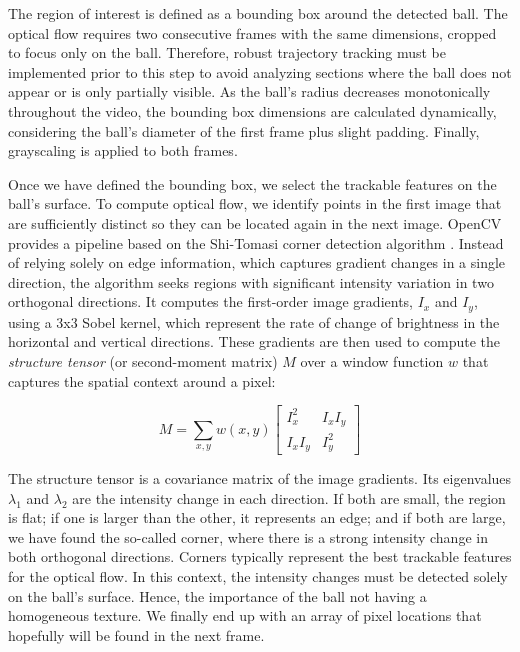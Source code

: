 The region of interest is defined as a bounding box around the detected ball. The optical flow requires two consecutive frames with the same dimensions, cropped to focus only on the ball. Therefore, robust trajectory tracking must be implemented prior to this step to avoid analyzing sections where the ball does not appear or is only partially visible. As the ball's radius decreases monotonically throughout the video, the bounding box dimensions are calculated dynamically, considering the ball's diameter of the first frame plus slight padding. Finally, grayscaling is applied to both frames.

Once we have defined the bounding box, we select the trackable features on the ball’s surface. To compute optical flow, we identify points in the first image that are sufficiently distinct so they can be located again in the next image. OpenCV provides a pipeline based on the Shi-Tomasi corner detection algorithm \cite{SHI94}. Instead of relying solely on edge information, which captures gradient changes in a single direction, the algorithm seeks regions with significant intensity variation in two orthogonal directions. It computes the first-order image gradients, $I_x$ and $I_y$, using a 3x3 Sobel kernel, which represent the rate of change of brightness in the horizontal and vertical directions. These gradients are then used to compute the \emph{structure tensor} (or second-moment matrix) $M$ over a window function $w$ that captures the spatial context around a pixel:

\begin{equation}
	M = \sum_{x,y}w(x, y) 
\begin{bmatrix} 
	I^2_x & I_x I_y \\
	I_x I_y & I^2_y
\end{bmatrix}
\end{equation}

The structure tensor is a covariance matrix of the image gradients. Its eigenvalues $\lambda_1$ and $\lambda_2$ are the intensity change in each direction. If both are small, the region is flat; if one is larger than the other, it represents an edge; and if both are large, we have found the so-called corner, where there is a strong intensity change in both orthogonal directions. Corners typically represent the best trackable features for the optical flow. In this context, the intensity changes must be detected solely on the ball’s surface. Hence, the importance of the ball not having a homogeneous texture. We finally end up with an array of pixel locations that hopefully will be found in the next frame.

